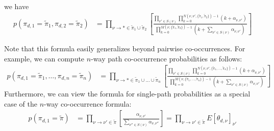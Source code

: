 \documentclass{article}
\begin{document}
we have
\begin{align}
p(\pi_{d,1} = \tilde\pi_1, \pi_{d,2} = \tilde\pi_2)
&=
\prod_{\nu \to * \in \tilde\pi_1 \cup \tilde\pi_2}
\left[
\frac
  {
    \prod_{\nu' \in S(\nu)}
    \prod_{k=0}^{N(\nu,\nu',\{\tilde\pi_1,\tilde\pi_2\}) - 1}
    (k + \alpha_{\nu,\nu'})
  }
  {
    \prod_{k=0}^{M(\nu,\{\tilde\pi_1,\tilde\pi_2\}) - 1}
    \left(
      k + \sum_{\nu' \in S(\nu)}\alpha_{\nu,\nu'}
    \right)
  }
\right]
\end{align}

Note that this formula easily generalizes beyond pairwise co-occurrences.
For example, we can compute $n$-way path co-occurrence probabilities as follows:
\begin{align}
p(\pi_{d,1} = \tilde\pi_1, \ldots, \pi_{d,n} = \tilde\pi_n)
&=
\prod_{\nu \to * \in \tilde\pi_1 \cup \ldots \cup \tilde\pi_n}
\left[
\frac
  {
    \prod_{\nu' \in S(\nu)}
    \prod_{k=0}^{N(\nu,\nu',\{\tilde\pi_1,\ldots,\tilde\pi_n\}) - 1}
    (k + \alpha_{\nu,\nu'})
  }
  {
    \prod_{k=0}^{M(\nu,\{\tilde\pi_1,\ldots,\tilde\pi_n\}) - 1}
    \left(
      k + \sum_{\nu' \in S(\nu)}\alpha_{\nu,\nu'}
    \right)
  }
\right]
\end{align}
Furthermore, we can view the formula for single-path probabilities as a special case of the $n$-way co-occurrence formula:
\begin{align}
p(\pi_{d,1} = \tilde\pi)
&=
\prod_{\nu \to \nu' \in \tilde\pi}
\left[
\frac
  {
    \alpha_{\nu,\nu'}
  }
  {
    \sum_{\nu'' \in S(\nu)}\alpha_{\nu,\nu''}
  }
\right]
=
\prod_{\nu \to \nu' \in \tilde\pi}
E[\theta_{d,\nu}]_{\nu'}
\end{align}
\end{document}
